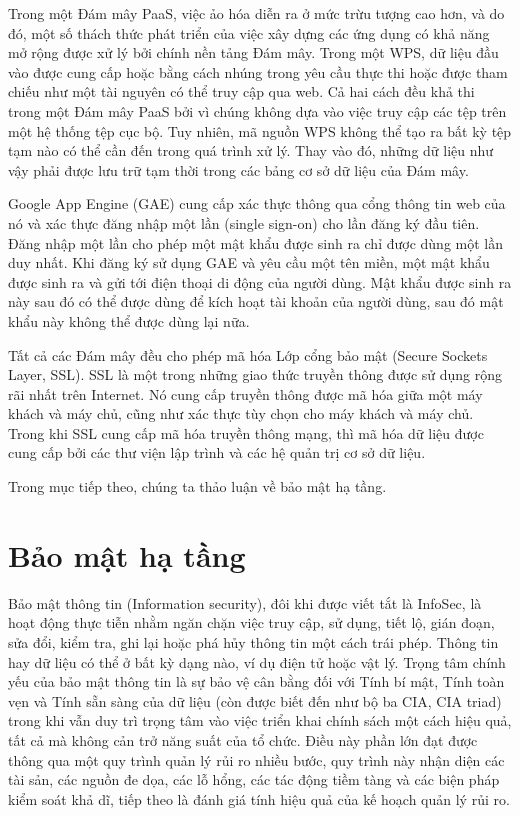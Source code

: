 Trong một Đám mây PaaS, việc ảo hóa diễn ra ở mức trừu tượng cao hơn, và do đó, một số thách thức phát triển của việc xây dựng các ứng dụng có khả năng mở rộng được xử lý bởi chính nền tảng Đám mây. Trong một WPS, dữ liệu đầu vào được cung cấp hoặc bằng cách nhúng trong yêu cầu thực thi hoặc được tham chiếu như một tài nguyên có thể truy cập qua web. Cả hai cách đều khả thi trong một Đám mây PaaS bởi vì chúng không dựa vào việc truy cập các tệp trên một hệ thống tệp cục bộ. Tuy nhiên, mã nguồn WPS không thể tạo ra bất kỳ tệp tạm nào có thể cần đến trong quá trình xử lý. Thay vào đó, những dữ liệu như vậy phải được lưu trữ tạm thời trong các bảng cơ sở dữ liệu của Đám mây.

Google App Engine (GAE) cung cấp xác thực thông qua cổng thông tin web của nó và xác thực đăng nhập một lần (single sign-on) cho lần đăng ký đầu tiên. Đăng nhập một lần cho phép một mật khẩu được sinh ra chỉ được dùng một lần duy nhất. Khi đăng ký sử dụng GAE và yêu cầu một tên miền, một mật khẩu được sinh ra và gửi tới điện thoại di động của người dùng. Mật khẩu được sinh ra này sau đó có thể được dùng để kích hoạt tài khoản của người dùng, sau đó mật khẩu này không thể được dùng lại nữa.

Tất cả các Đám mây đều cho phép mã hóa Lớp cổng bảo mật (Secure Sockets Layer, SSL). SSL là một trong những giao thức truyền thông được sử dụng rộng rãi nhất trên Internet. Nó cung cấp truyền thông được mã hóa giữa một máy khách và máy chủ, cũng như xác thực tùy chọn cho máy khách và máy chủ. Trong khi SSL cung cấp mã hóa truyền thông mạng, thì mã hóa dữ liệu được cung cấp bởi các thư viện lập trình và các hệ quản trị cơ sở dữ liệu.

Trong mục tiếp theo, chúng ta thảo luận về bảo mật hạ tầng.

\section{Bảo mật hạ tầng}

Bảo mật thông tin (Information security), đôi khi được viết tắt là InfoSec, là hoạt động thực tiễn nhằm ngăn chặn việc truy cập, sử dụng, tiết lộ, gián đoạn, sửa đổi, kiểm tra, ghi lại hoặc phá hủy thông tin một cách trái phép. Thông tin hay dữ liệu có thể ở bất kỳ dạng nào, ví dụ điện tử hoặc vật lý. Trọng tâm chính yếu của bảo mật thông tin là sự bảo vệ cân bằng đối với Tính bí mật, Tính toàn vẹn và Tính sẵn sàng của dữ liệu (còn được biết đến như bộ ba CIA, CIA triad) trong khi vẫn duy trì trọng tâm vào việc triển khai chính sách một cách hiệu quả, tất cả mà không cản trở năng suất của tổ chức. Điều này phần lớn đạt được thông qua một quy trình quản lý rủi ro nhiều bước, quy trình này nhận diện các tài sản, các nguồn đe dọa, các lỗ hổng, các tác động tiềm tàng và các biện pháp kiểm soát khả dĩ, tiếp theo là đánh giá tính hiệu quả của kế hoạch quản lý rủi ro.

